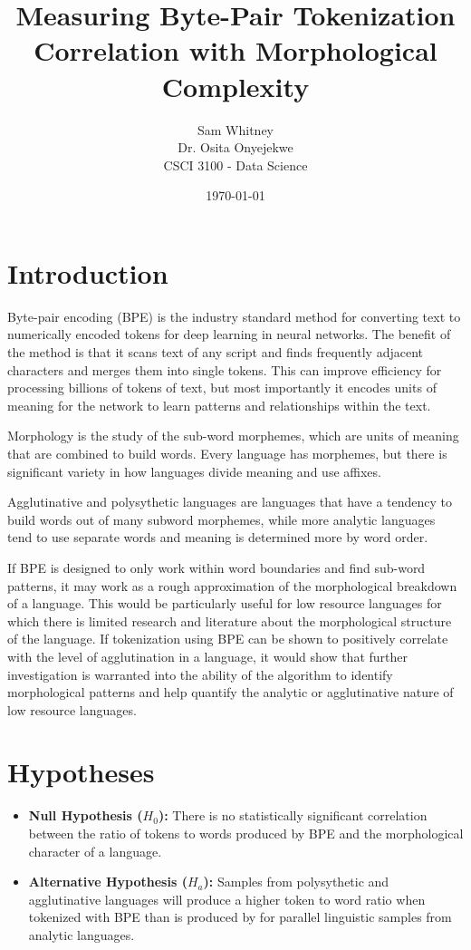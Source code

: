 \documentclass[11pt]{article}
\title{Measuring Byte-Pair Tokenization Correlation with Morphological Complexity}
\author{Sam Whitney \\ Dr. Osita Onyejekwe \\ CSCI 3100 - Data Science }
\date{\today}
\begin{document}
\maketitle

\section{Introduction}

Byte-pair encoding (BPE) is the industry standard method for converting text to numerically encoded tokens for deep learning in neural networks. The benefit of the method is that it scans text of any script and finds frequently adjacent characters and merges them into single tokens. This can improve efficiency for processing billions of tokens of text, but most importantly it encodes units of meaning for the network to learn patterns and relationships within the text. 

Morphology is the study of the sub-word morphemes, which are units of meaning that are combined to build words. Every language has morphemes, but there is significant variety in how languages divide meaning and use affixes. 

Agglutinative and polysythetic languages are languages that have a tendency to build words out of many subword morphemes, while more analytic languages tend to use separate words and meaning is determined more by word order. 

If BPE is designed to only work within word boundaries and find sub-word patterns, it may work as a rough approximation of the morphological breakdown of a language. This would be particularly useful for low resource languages for which there is limited research and literature about the morphological structure of the language. If tokenization using BPE can be shown to positively correlate with the level of agglutination in a language, it would show that further investigation is warranted into the ability of the algorithm to identify morphological patterns and help quantify the analytic or agglutinative nature of low resource languages. 

\section{Hypotheses}
\begin{itemize}
    \item \textbf{Null Hypothesis ($H_0$):}  There is no statistically significant correlation between the ratio of tokens to words produced by BPE and the morphological character of a language.
    \item \textbf{Alternative Hypothesis ($H_a$):} Samples from polysythetic and agglutinative languages will produce a higher token to word ratio when tokenized with BPE than is produced by for parallel linguistic samples from analytic languages.
\end{itemize}
\end{document}
